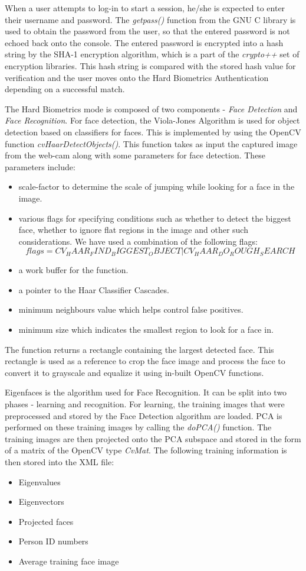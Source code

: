 \documentclass[%
        final,
        notitlepage,
        narroweqnarray,
        inline,
        ]{ieee}
\begin{document}
When a user attempts to log-in to start a session, he/she is expected to enter their username and password. The \emph{getpass()} function from the GNU C library is used to obtain the password from the user, so that the entered password is not echoed back onto the console. The entered password is encrypted into a hash string by the SHA-1 encryption algorithm, which is a part of the \emph{crypto++} set of encryption libraries. This hash string is compared with the stored hash value for verification and the user moves onto the Hard Biometrics Authentication depending on a successful match. 

The Hard Biometrics mode is composed of two components - \emph{Face Detection} and \emph{Face Recognition}. For face detection, the Viola-Jones Algorithm is used for object detection based on classifiers for faces. This is implemented by using the OpenCV function \emph{cvHaarDetectObjects()}. This function takes as input the captured image from the web-cam along with some parameters for face detection. These parameters include:
\begin{itemize}
\item scale-factor to determine the scale of jumping while looking for a face in the image. 
\item various flags for specifying conditions such as whether to detect the biggest face, whether to ignore flat regions in the image and other such considerations. We have used a combination of the following flags:
\begin{equation} 
flags = CV_HAAR_FIND_BIGGEST_OBJECT | CV_HAAR_DO_ROUGH_SEARCH
\end{equation}
\item a work buffer for the function.
\item a pointer to the Haar Classifier Cascades.
\item minimum neighbours value which helps control false positives.
\item minimum size which indicates the smallest region to look for a face in.
\end {itemize}
The function returns a rectangle containing the largest detected face. This rectangle is used as a reference to crop the face image and process the face to convert it to grayscale and equalize it using in-built OpenCV functions.

Eigenfaces is the algorithm used for Face Recognition. It can be split into two phases - learning and recognition. For learning, the training images that were preprocessed and stored by the Face Detection algorithm are loaded. PCA is performed on these training images by calling the \emph{doPCA()} function. The training images are then projected onto the PCA subspace and stored in the form of a matrix of the OpenCV type \emph{CvMat}. The following training information is then stored into the XML file:
\begin{itemize}
\item Eigenvalues
\item Eigenvectors
\item Projected faces
\item Person ID numbers
\item Average training face image
\end {itemize}
\end{document}
